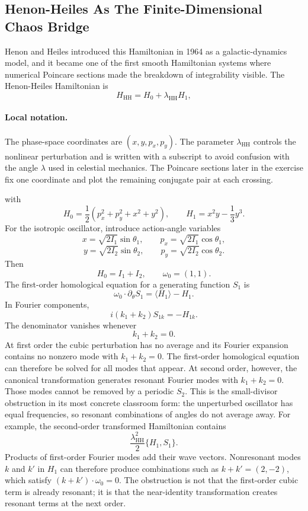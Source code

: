 \subsection{Henon-Heiles As The Finite-Dimensional Chaos Bridge}
\label{sec:lab-henon-heiles}

Henon and Heiles introduced this Hamiltonian in 1964 as a galactic-dynamics
model, and it became one of the first smooth Hamiltonian systems where
numerical Poincare sections made the breakdown of integrability visible. The
Henon-Heiles Hamiltonian is
\[
  H_{\mathrm{HH}}
  =
  H_0+\lambda_{\mathrm{HH}}H_1,
\]

\paragraph{Local notation.}
The phase-space coordinates are \((x,y,p_x,p_y)\).  The parameter
\(\lambda_{\mathrm{HH}}\) controls the nonlinear perturbation and is written
with a subscript to avoid confusion with the angle \(\lambda\) used in
celestial mechanics.  The Poincare sections later in the exercise fix one
coordinate and plot the remaining conjugate pair at each crossing.

with
\[
  H_0=
  \frac12(p_x^2+p_y^2+x^2+y^2),
  \qquad
  H_1=x^2y-\frac13y^3.
\]
For the isotropic oscillator, introduce action-angle variables
\[
  x=\sqrt{2I_1}\sin\theta_1,
  \qquad
  p_x=\sqrt{2I_1}\cos\theta_1,
\]
\[
  y=\sqrt{2I_2}\sin\theta_2,
  \qquad
  p_y=\sqrt{2I_2}\cos\theta_2.
\]
Then
\[
  H_0=I_1+I_2,
  \qquad
  \omega_0=(1,1).
\]
The first-order homological equation for a generating function \(S_1\) is
\[
  \omega_0\cdot\partial_\theta S_1
  =
  \langle H_1\rangle-H_1.
\]
In Fourier components,
\[
  i(k_1+k_2)S_{1k}=-H_{1k}.
\]
The denominator vanishes whenever
\[
  k_1+k_2=0.
\]
At first order the cubic perturbation has no average and its Fourier expansion
contains no nonzero mode with \(k_1+k_2=0\). The first-order homological
equation can therefore be solved for all modes that appear. At second order,
however, the canonical transformation generates resonant Fourier modes with
\(k_1+k_2=0\). Those modes cannot be removed by a periodic \(S_2\). This is the
small-divisor obstruction in its most concrete classroom form: the unperturbed
oscillator has equal frequencies, so resonant combinations of angles do not
average away.
For example, the second-order transformed Hamiltonian contains
\[
  \frac{\lambda_{\mathrm{HH}}^2}{2}\{H_1,S_1\}.
\]
Products of first-order Fourier modes add their wave vectors. Nonresonant
modes \(k\) and \(k'\) in \(H_1\) can therefore produce combinations such as
\(k+k'=(2,-2)\), which satisfy \((k+k')\cdot\omega_0=0\). The obstruction is
not that the first-order cubic term is already resonant; it is that the
near-identity transformation creates resonant terms at the next order.

